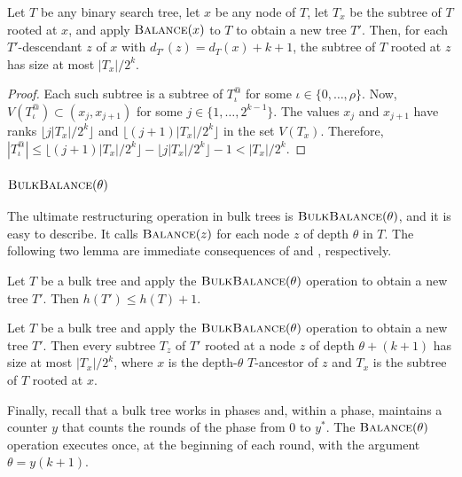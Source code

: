 \documentclass[kpfonts]{patmorin}
\begin{document}
\begin{lem}
  Let $T$ be any binary search tree, let $x$ be any node of $T$, let $T_x$ be the subtree of $T$ rooted at $x$, and apply $\textsc{Balance}(x)$ to $T$ to obtain a new tree $T'$.  Then, for each $T'$-descendant $z$ of $x$ with $d_{T'}(z)=d_{T}(x)+k+1$, the subtree of $T$ rooted at $z$ has size at most $|T_x|/2^k$.
\end{lem}

\begin{proof}
  Each such subtree is a subtree of $T^@_\iota$ for some $\iota\in\{0,\ldots,\rho\}$. Now, $V(T^@_\iota)\subset (x_j,x_{j+1})$ for some $j\in\{1,\ldots,2^{k-1}\}$.  The values $x_j$ and $x_{j+1}$ have ranks $\lfloor j|T_x|/2^k\rfloor$ and $\lfloor (j+1)|T_x|/2^k\rfloor$ in the set $V(T_x)$.  Therefore, $|T^@_\iota|\le \lfloor (j+1)|T_x|/2^k\rfloor- \lfloor j|T_x|/2^k\rfloor -1 < |T_x|/2^k$.
\end{proof}

\subsubsection{$\textsc{BulkBalance}(\theta)$}

The ultimate restructuring operation in bulk trees is $\textsc{BulkBalance}(\theta)$, and it is easy to describe.  It calls $\textsc{Balance}(z)$ for each node $z$ of depth $\theta$ in $T$.
The following two lemma are immediate consequences of  and , respectively.

\begin{lem}
  Let $T$ be a bulk tree and apply the $\textsc{BulkBalance}(\theta)$ operation to obtain a new tree $T'$.  Then $h(T')\le h(T)+1$.
\end{lem}

\begin{lem}
  Let $T$ be a bulk tree and apply the $\textsc{BulkBalance}(\theta)$ operation to obtain a new tree $T'$.  Then every subtree $T_z$ of $T'$ rooted at a node $z$ of depth $\theta+(k+1)$ has size at most $|T_x|/2^k$, where $x$ is the depth-$\theta$ $T$-ancestor of $z$ and $T_x$ is the subtree of $T$ rooted at $x$.
\end{lem}

Finally, recall that a bulk tree works in phases and, within a phase, maintains a counter $y$ that counts the rounds of the phase from $0$ to $y^*$.  The $\textsc{Balance}(\theta)$ operation executes once, at the beginning of each round, with the argument $\theta=y(k+1)$.
\end{document}
